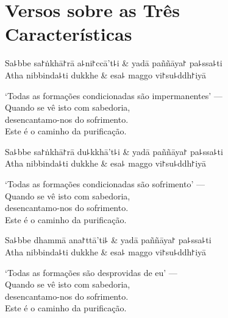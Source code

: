 \chapter{Versos sobre as Três Características}


\begin{leader}
\end{leader}

\begin{twochants}
  Sa꜕bbe sa꜓ṅkhā꜓rā a꜕ni꜓ccā't꜕i & yadā paññāya꜓ pa꜕ssa꜕ti \\
  Atha nibbinda꜕ti dukkhe & esa꜕ maggo vi꜓su꜕ddh꜓iyā \\
\end{twochants}

\begin{english}
  `Todas as formações condicionadas são impermanentes' ---\\
  Quando se vê isto com sabedoria,\\
  desencantamo-nos do sofrimento.\\
  Este é o caminho da purificação.
\end{english}

\begin{twochants}
  Sa꜕bbe sa꜓ṅkhā꜓rā du꜕kkhā't꜕i & yadā paññāya꜓ pa꜕ssa꜕ti \\
  Atha nibbinda꜕ti dukkhe & esa꜕ maggo vi꜓su꜕ddh꜓iyā \\
\end{twochants}

\begin{english}
  `Todas as formações condicionadas são sofrimento' ---\\
  Quando se vê isto com sabedoria,\\
  desencantamo-nos do sofrimento.\\
  Este é o caminho da purificação.
\end{english}

\begin{twochants}
  Sa꜕bbe dhammā ana꜓ttā'ti꜕ & yadā paññāya꜓ pa꜕ssa꜕ti \\
  Atha nibbinda꜕ti dukkhe & esa꜕ maggo vi꜓su꜕ddh꜓iyā \\
\end{twochants}

\begin{english}
  `Todas as formações são desprovidas de eu' ---\\
  Quando se vê isto com sabedoria,\\
  desencantamo-nos do sofrimento.\\
  Este é o caminho da purificação.
\end{english}

